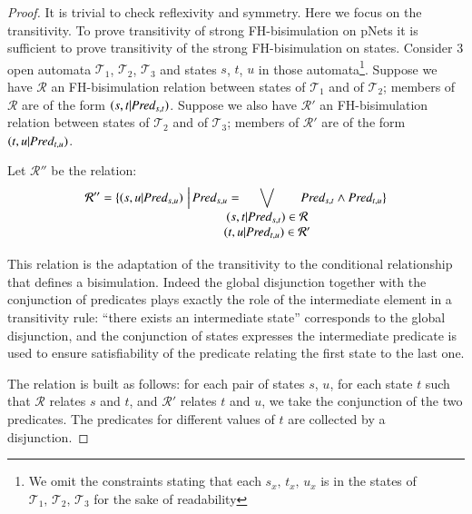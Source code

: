 \documentclass{elsarticle}
\begin{document}
              \begin{proof}
       	It is trivial to check reflexivity and symmetry. Here we focus on the
       	transitivity. 
       	To prove transitivity of strong FH-bisimulation on pNets it is sufficient to 
       	prove 
       	transitivity of the strong FH-bisimulation on states. Consider 3 open automata 
       	$\mathcal{T}_1$, $\mathcal{T}_2$, $\mathcal{T}_3$ and states $s$, $t$, $u$ 
       	in those 
       	automata\footnote{We omit the constraints stating that each $s_x,\,t_x,\,u_x$ is 
       	in the 
       	states of 
       		$\mathcal{T}_1,\,\mathcal{T}_2,\,\mathcal{T}_3$ for the sake of readability}.
       	Suppose we have $\mathcal{R}$ an FH-bisimulation relation between states of 
       	$\mathcal{T}_1$ and of  $\mathcal{T}_2$; members of $\mathcal{R}$ are of the form 
       	$(s,t|\Pred_{s,t})$.
       	Suppose we also  have $\mathcal{R}'$ an FH-bisimulation relation between states 
       	of 
       	$\mathcal{T}_2$ and of  $\mathcal{T}_3$; members of $\mathcal{R}'$ are of the 
       	form 
       	$(t,u|\Pred_{t,u})$.
       	
       	Let $\mathcal{R}''$ be the relation: 
       	\[\mathcal{R}'' = 
       	\{(s,u|\Pred_{s,u})\,\,\Big|\,\Pred_{s,u}=\hspace{-0.7cm}\bigvee_{\begin{array}{c}       		
       		(s,t|\Pred_{s,t})\in\mathcal{R}\\ (t,u|\Pred_{t,u})\in\mathcal{R}' 	
       		\end{array}
       }\hspace{-0.5cm}\Pred_{s,t}\land\Pred_{t,u}\}\]

This relation is the adaptation of the transitivity to the conditional relationship that 
defines a bisimulation. Indeed the global disjunction together with the conjunction of 
predicates plays exactly the role of the intermediate element in a transitivity rule: 
``there exists an intermediate state'' corresponds to the global disjunction, and the 
conjunction of states expresses the intermediate predicate is used to ensure 
satisfiability of the predicate relating the first state to the last one.
       	
       	The relation is built as follows: for each pair of states $s$, $u$, for each 
       	state 
       	$t$ such that $\mathcal{R}$ relates $s$ and $t$, and $\mathcal{R}'$ relates 
       	$t$ 
       	and $u$, we take the conjunction of the two predicates. The predicates for 
       	different 
       	values of $t$ are collected by a disjunction. 
       	

\end{proof}
\end{document}
